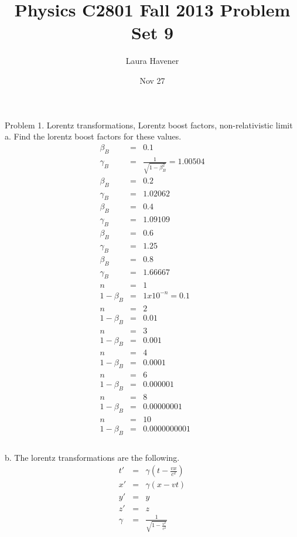 \documentclass[11pt]{amsart}
\title{Physics C2801 Fall 2013 Problem Set 9}
\author{Laura Havener}
\date{Nov 27} %
\begin{document}
\maketitle

Problem 1. Lorentz transformations, Lorentz boost factors, non-relativistic limit \\
a. Find the lorentz boost factors for these values. \\ 
\begin{eqnarray*}
\beta_{B} &=& 0.1 \\
\gamma_{B} &=& \frac{1}{\sqrt{1-\beta_{B}^{2}}} = 1.00504 \\
\beta_{B} &=& 0.2 \\
\gamma_{B} &=& 1.02062 \\
\beta_{B} &=& 0.4 \\
\gamma_{B} &=& 1.09109 \\
\beta_{B} &=& 0.6 \\
\gamma_{B} &=& 1.25 \\
\beta_{B} &=& 0.8 \\
\gamma_{B} &=& 1.66667 \\
n &=& 1 \\
1-\beta_{B} &=& 1x10^{-n} = 0.1 \\
n &=& 2 \\
1-\beta_{B} &=&  0.01 \\
n &=& 3 \\
1-\beta_{B} &=&  0.001 \\
n &=& 4 \\
1-\beta_{B} &=&  0.0001 \\
n &=& 6 \\
1-\beta_{B} &=&  0.000001 \\
n &=& 8 \\
1-\beta_{B} &=&  0.00000001 \\
n &=& 10 \\
1-\beta_{B} &=&  0.0000000001 \\
\end{eqnarray*} \\
b. The lorentz transformations are the following. \\
\begin{eqnarray*} 
t' &=& \gamma(t-\frac{vx}{c^{2}}) \\
x' &=& \gamma(x-vt) \\
y' &=& y \\
z' &=& z \\
\gamma &=& \frac{1}{\sqrt{1-\frac{v^{2}}{c^{2}}}} \\
\end{eqnarray*} \\
\end{document}

